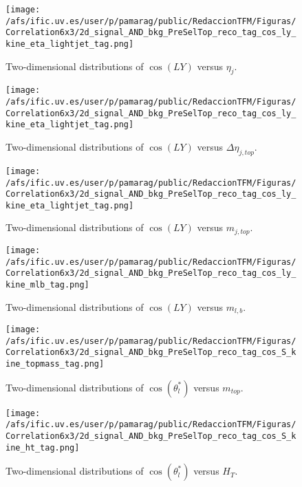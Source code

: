 \begin{figure}[h]
\centering
\texttt{[image: /afs/ific.uv.es/user/p/pamarag/public/RedaccionTFM/Figuras/Correlation6x3/2d\_signal\_AND\_bkg\_PreSelTop\_reco\_tag\_cos\_ly\_kine\_eta\_lightjet\_tag.png]}
\caption{Two-dimensional distributions of $\cos(LY)$ versus $\eta_{j}$.}
\end{figure}

\begin{figure}[h]
\centering
\texttt{[image: /afs/ific.uv.es/user/p/pamarag/public/RedaccionTFM/Figuras/Correlation6x3/2d\_signal\_AND\_bkg\_PreSelTop\_reco\_tag\_cos\_ly\_kine\_eta\_lightjet\_tag.png]}
\caption{Two-dimensional distributions of $\cos(LY)$ versus $\Delta\eta_{j,top}$.}
\end{figure}

\begin{figure}[h]
\centering
\texttt{[image: /afs/ific.uv.es/user/p/pamarag/public/RedaccionTFM/Figuras/Correlation6x3/2d\_signal\_AND\_bkg\_PreSelTop\_reco\_tag\_cos\_ly\_kine\_eta\_lightjet\_tag.png]}
\caption{Two-dimensional distributions of $\cos(LY)$ versus $m_{j,top}$.}
\end{figure}


\begin{figure}[h]
\centering
\texttt{[image: /afs/ific.uv.es/user/p/pamarag/public/RedaccionTFM/Figuras/Correlation6x3/2d\_signal\_AND\_bkg\_PreSelTop\_reco\_tag\_cos\_ly\_kine\_mlb\_tag.png]}
\caption{Two-dimensional distributions of $\cos(LY)$ versus $m_{l,b}$.}
\label{Fig:mlbVScosLY}
\end{figure}


\begin{figure}[h]
\centering
\texttt{[image: /afs/ific.uv.es/user/p/pamarag/public/RedaccionTFM/Figuras/Correlation6x3/2d\_signal\_AND\_bkg\_PreSelTop\_reco\_tag\_cos\_S\_kine\_topmass\_tag.png]}
\caption{Two-dimensional distributions of $\cos(\theta_l^{*})$ versus $m_{top}$.}
\label{Fig:SA}
\end{figure}


\clearpage
\vspace*{1cm}
\begin{figure}[h]
\centering
\texttt{[image: /afs/ific.uv.es/user/p/pamarag/public/RedaccionTFM/Figuras/Correlation6x3/2d\_signal\_AND\_bkg\_PreSelTop\_reco\_tag\_cos\_S\_kine\_ht\_tag.png]}
\caption{Two-dimensional distributions of $\cos(\theta_l^{*})$ versus $H_T$.}
\end{figure}


